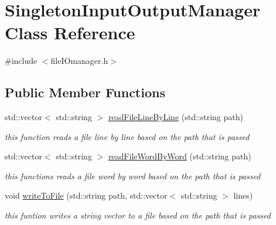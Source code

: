\hypertarget{class_singleton_input_output_manager}{}\section{Singleton\+Input\+Output\+Manager Class Reference}
\label{class_singleton_input_output_manager}


{\ttfamily \#include $<$file\+I\+Omanager.\+h$>$}

\subsection*{Public Member Functions}
\begin{DoxyCompactItemize}
\item 
\hypertarget{class_singleton_input_output_manager_ae8e0963962610135ff444d05c6350186}{}\label{class_singleton_input_output_manager_ae8e0963962610135ff444d05c6350186} 
std\+::vector$<$ std\+::string $>$ \hyperlink{class_singleton_input_output_manager_ae8e0963962610135ff444d05c6350186}{read\+File\+Line\+By\+Line} (std\+::string path)
\begin{DoxyCompactList}\small\item\em this function reads a file line by line based on the path that is passed \end{DoxyCompactList}\item 
\hypertarget{class_singleton_input_output_manager_aee120f3719748d91e8cb80de1eeac7e4}{}\label{class_singleton_input_output_manager_aee120f3719748d91e8cb80de1eeac7e4} 
std\+::vector$<$ std\+::string $>$ \hyperlink{class_singleton_input_output_manager_aee120f3719748d91e8cb80de1eeac7e4}{read\+File\+Word\+By\+Word} (std\+::string path)
\begin{DoxyCompactList}\small\item\em this functions reads a file word by word based on the path that is passed \end{DoxyCompactList}\item 
\hypertarget{class_singleton_input_output_manager_ac04ff26a6a42155739156a9e6f1ec0e2}{}\label{class_singleton_input_output_manager_ac04ff26a6a42155739156a9e6f1ec0e2} 
void \hyperlink{class_singleton_input_output_manager_ac04ff26a6a42155739156a9e6f1ec0e2}{write\+To\+File} (std\+::string path, std\+::vector$<$ std\+::string $>$ lines)
\begin{DoxyCompactList}\small\item\em this funtion writes a string vector to a file based on the path that is passed \end{DoxyCompactList}\item 

\end{DoxyCompactItemize}
